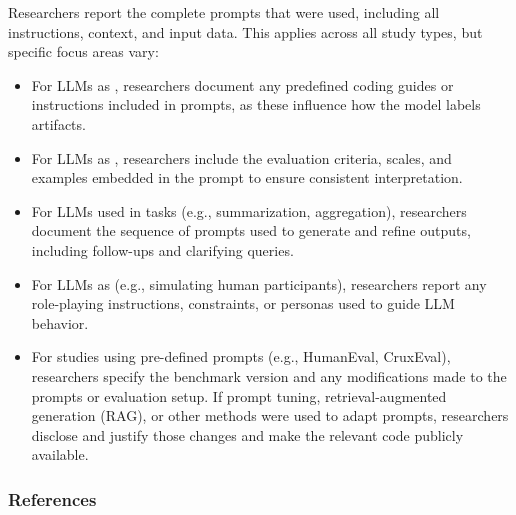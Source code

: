 Researchers \must report the complete prompts that were used, including all instructions, context, and input data. This applies across all study types, but specific focus areas vary:

\begin{itemize}
  \item For LLMs as \annotators, researchers \must document any predefined coding guides or instructions included in prompts, as these influence how the model labels artifacts.
  \item For LLMs as \judges, researchers \must include the evaluation criteria, scales, and examples embedded in the prompt to ensure consistent interpretation.
  \item For LLMs used in \synthesis tasks (e.g., summarization, aggregation), researchers \must document the sequence of prompts used to generate and refine outputs, including follow-ups and clarifying queries.
  \item For LLMs as \participants (e.g., simulating human participants), researchers \must report any role-playing instructions, constraints, or personas used to guide LLM behavior.
  \item For \benchmarkingtasks studies using pre-defined prompts (e.g., HumanEval, CruxEval), researchers \must specify the benchmark version and any modifications made to the prompts or evaluation setup. If prompt tuning, retrieval-augmented generation (RAG), or other methods were used to adapt prompts, researchers \must disclose and justify those changes and \should make the relevant code publicly available.
\end{itemize}


\subsubsection{References}





